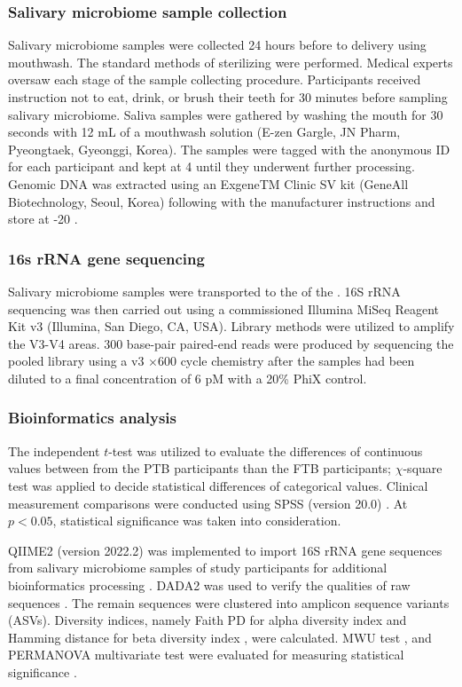\documentclass[11pt, a4paper, onecolumn, oneside]{report}
\begin{document}
            \subsubsection{Salivary microbiome sample collection}
                Salivary microbiome samples were collected 24 hours before to delivery using mouthwash. The standard methods of sterilizing were performed. Medical experts oversaw each stage of the sample collecting procedure. Participants received instruction not to eat, drink, or brush their teeth for 30 minutes before sampling salivary microbiome. Saliva samples were gathered by washing the mouth for 30 seconds with 12 mL of a mouthwash solution (E-zen Gargle, JN Pharm, Pyeongtaek, Gyeonggi, Korea). The samples were tagged with the anonymous ID for each participant and kept at 4 \textcelsius until they underwent further processing. Genomic DNA was extracted using an ExgeneTM Clinic SV kit (GeneAll Biotechnology, Seoul, Korea) following with the manufacturer instructions and store at -20 \textcelsius.

            \subsubsection{16s rRNA gene sequencing}
                Salivary microbiome samples were transported to the  of the . 16S rRNA sequencing was then carried out using a commissioned Illumina MiSeq Reagent Kit v3 (Illumina, San Diego, CA, USA). Library methods were utilized to amplify the V3-V4 areas. 300 base-pair paired-end reads were produced by sequencing the pooled library using a v3 $\times$600 cycle chemistry after the samples had been diluted to a final concentration of 6 pM with a 20\% PhiX control.

            \subsubsection{Bioinformatics analysis}
                The independent $t$-test was utilized to evaluate the differences of continuous values between from the PTB participants than the FTB participants; $\chi$-square test was applied to decide statistical differences of categorical values. Clinical measurement comparisons were conducted using SPSS (version 20.0) \cite{SPSS-1}. At $p < 0.05$, statistical significance was taken into consideration.

                QIIME2 (version 2022.2) was implemented to import 16S rRNA gene sequences from salivary microbiome samples of study participants for additional bioinformatics processing \cite{QIIME2-1}. DADA2 was used to verify the qualities of raw sequences \cite{DADA2-1}. The remain sequences were clustered into amplicon sequence variants (ASVs). Diversity indices, namely Faith PD for alpha diversity index \cite{FaithPD-1} and Hamming distance for beta diversity index \cite{Hamming-1}, were calculated. MWU test \cite{MWW-1}, and PERMANOVA multivariate test were evaluated for measuring statistical significance \cite{PERMANOVA-1, PERMANOVA-2}.
\end{document}
